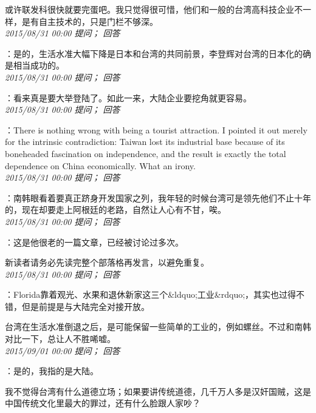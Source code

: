 \documentclass[twocolumn]{ctexart}
\begin{document}
或许联发科很快就要完蛋吧。我只觉得很可惜，他们和一般的台湾高科技企业不一样，是有自主技术的，只是门栏不够深。\\

\textit{\hfill\noindent\small 2015/08/31 00:00 提问； 回答}

：是的，生活水准大幅下降是日本和台湾的共同前景，李登辉对台湾的日本化的确是相当成功的。\\

\textit{\hfill\noindent\small 2015/08/31 00:00 提问； 回答}

：看来真是要大举登陆了。如此一来，大陆企业要挖角就更容易。\\

\textit{\hfill\noindent\small 2015/08/31 00:00 提问； 回答}

：There is nothing wrong with being a tourist attraction. I pointed it out merely for the intrinsic contradiction: Taiwan lost its industrial base because of its boneheaded fascination on independence, and the result is exactly the total dependence on China economically. What an irony.\\

\textit{\hfill\noindent\small 2015/08/31 00:00 提问； 回答}

：南韩眼看着要真正跻身开发国家之列，我年轻的时候台湾可是领先他们不止十年的，现在却要走上阿根廷的老路，自然让人心有不甘，唉。\\

\textit{\hfill\noindent\small 2015/08/31 00:00 提问； 回答}

：这是他很老的一篇文章，已经被讨论过多次。

新读者请务必先读完整个部落格再发言，以避免重复。\\

\textit{\hfill\noindent\small 2015/08/31 00:00 提问； 回答}

：Florida靠着观光、水果和退休新家这三个\&ldquo;工业\&rdquo;，其实也过得不错，但是前提是与大陆完全对接开放。

台湾在生活水准倒退之后，是可能保留一些简单的工业的，例如螺丝。不过和南韩对比一下，总让人不胜唏嘘。\\

\textit{\hfill\noindent\small 2015/09/01 00:00 提问； 回答}

：是的，我指的是大陆。

我不觉得台湾有什么道德立场；如果要讲传统道德，几千万人多是汉奸国贼，这是中国传统文化里最大的罪过，还有什么脸跟人家吵？
\end{document}
